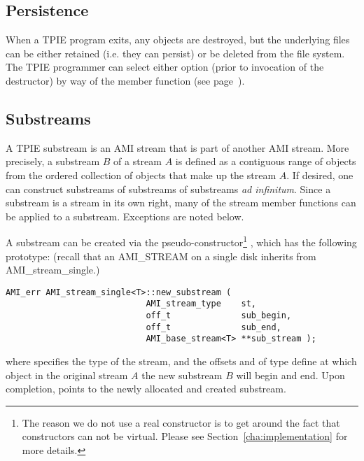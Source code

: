 
\subsection{Persistence}

When a TPIE program exits, any  objects are
destroyed, but the underlying files can be either retained
(i.e. they can persist) or be deleted from the file system.
The TPIE programmer can select either option (prior to
invocation of the  destructor) by way of
the  member function  (see
page~\pageref{member:ami-persist}).

\subsection{Substreams}

A TPIE substream is an AMI stream that is part of another
AMI stream. More precisely, a substream $B$ of a
stream $A$ is defined as a contiguous range of objects from
the ordered collection of objects that make up the stream
$A$.  If desired, one can construct substreams of substreams
of substreams {\em ad infinitum}. Since a substream is a
stream in its own right, many of the stream member functions
can be applied to a substream. Exceptions are noted below.

A substream can be created via the pseudo-constructor\footnote{%
   The reason we do not use a real constructor is to get
   around the fact that constructors can not be virtual.
   Please see Section~\ref{cha:implementation} for more
   details.} 
, which has the following
prototype: (recall that an AMI\_STREAM on a single disk
inherits from AMI\_stream\_single.)
\begin{verbatim}
AMI_err AMI_stream_single<T>::new_substream ( 
                            AMI_stream_type    st,
                            off_t              sub_begin,
                            off_t              sub_end,
                            AMI_base_stream<T> **sub_stream );
\end{verbatim}
where  specifies the type of the stream, and the
offsets  and  of type
 define at which object in the original
stream $A$ the new substream $B$ will begin and end. Upon
completion,  points to the newly
allocated and created substream.


